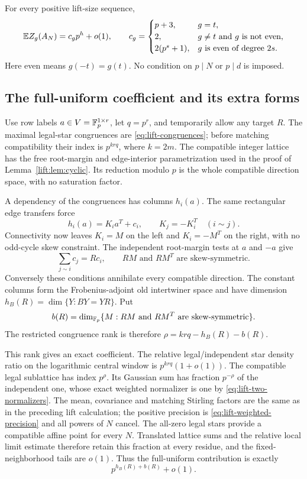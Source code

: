 \begin{theorem}\label{bip:thm:moments}
For every positive lift-size sequence,
\begin{equation}\label{eq:bip-moments}
 \mathbb E Z_g(A_N)=c_g p^h+o(1),\qquad
 c_g=\begin{cases}
 p+3,&g=t,\\
 2,&g\ne t\text{ and }g\text{ is not even},\\
 2(p^s+1),&g\text{ is even of degree }2s.
 \end{cases}
\end{equation}
Here even means $g(-t)=g(t)$. No condition on $p\mid N$ or
$p\mid d$ is imposed.
\end{theorem}

\subsection{The full-uniform coefficient and its extra forms}
Use row labels $a\in V=\mathbb F_p^{1\times r}$, let $q=p^r$, and
temporarily allow any target $R$. The maximal legal-star congruences
are \eqref{eq:lift-congruences}; before matching compatibility their
index is $p^{krq}$, where $k=2m$. The compatible integer lattice
has the free root-margin and edge-interior parametrization used in
the proof of Lemma~\ref{lift:lem:cyclic}. Its reduction modulo $p$
is the whole compatible direction space, with no saturation factor.

A dependency of the congruences has columns $h_i(a)$.
The same rectangular edge transfers force
\[
 h_i(a)=K_i a^T+c_i,\qquad K_j=-K_i^T\quad(i\sim j).
\]
Connectivity now leaves $K_i=M$ on the left and $K_i=-M^T$ on
the right, with no odd-cycle skew constraint. The independent
root-margin tests at $a$ and $-a$ give
\[
 \sum_{j\sim i}c_j=Rc_i,\qquad
 RM\text{ and }RM^T\text{ are skew-symmetric}.
\]
Conversely these conditions annihilate every compatible direction.
The constant columns form the Frobenius-adjoint old intertwiner
space and have dimension $h_B(R)=\dim\{Y:BY=YR\}$. Put
\[
 b(R)=\dim_{\mathbb F_p}\{M:RM\text{ and }RM^T
                                      \text{ are skew-symmetric}\}.
\]
The restricted congruence rank is therefore
$\rho=krq-h_B(R)-b(R)$.

This rank gives an exact coefficient. The relative legal/independent
star density ratio on the logarithmic central window is
$p^{krq}(1+o(1))$. The compatible legal sublattice has index $p^\rho$.
Its Gaussian sum has fraction $p^{-\rho}$ of the independent one,
whose exact weighted normalizer is one by
\eqref{eq:lift-two-normalizers}. The mean, covariance and matching
Stirling factors are the same as in the preceding lift calculation;
the positive precision is \eqref{eq:lift-weighted-precision} and
all powers of $N$ cancel. The all-zero legal stars provide a
compatible affine point for every $N$. Translated lattice sums and
the relative local limit estimate therefore retain this fraction
at every residue, and the fixed-neighborhood tails are $o(1)$.
Thus the full-uniform contribution is exactly
\begin{equation}\label{eq:bip-uniform}
 p^{h_B(R)+b(R)}+o(1).
\end{equation}

